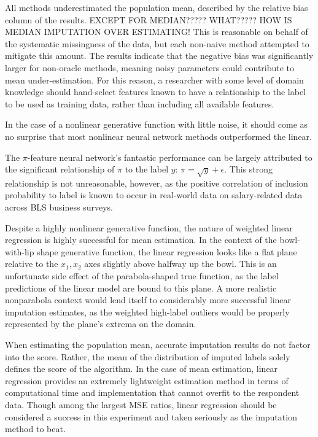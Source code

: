 \documentclass[12pt,twoside]{reedthesis}
\begin{document}
All methods underestimated the population mean, described by the
relative bias column of the results. EXCEPT FOR MEDIAN????? WHAT?????
HOW IS MEDIAN IMPUTATION OVER ESTIMATING! This is reasonable on behalf
of the systematic missingness of the data, but each non-naive method
attempted to mitigate this amount. The results indicate that the
negative bias was significantly larger for non-oracle methods, meaning
noisy parameters could contribute to mean under-estimation. For this
reason, a researcher with some level of domain knowledge should
hand-select features known to have a relationship to the label to be
used as training data, rather than including all available features.

In the case of a nonlinear generative function with little noise, it
should come as no surprise that most nonlinear neural network methods
outperformed the linear.

The \(\pi\)-feature neural network's fantastic performance can be
largely attributed to the significant relationship of \(\pi\) to the
label \(y\): \(\pi = \sqrt{y} + \epsilon\). This strong relationship is
not unreasonable, however, as the positive correlation of inclusion
probability to label is known to occur in real-world data on
salary-related data across BLS business surveys.

Despite a highly nonlinear generative function, the nature of weighted
linear regression is highly successful for mean estimation. In the
context of the bowl-with-lip shape generative function, the linear
regression looks like a flat plane relative to the \(x_1, x_2\) axes
slightly above halfway up the bowl. This is an unfortunate side effect
of the parabola-shaped true function, as the label predictions of the
linear model are bound to this plane. A more realistic nonparabola
context would lend itself to considerably more successful linear
imputation estimates, as the weighted high-label outliers would be
properly represented by the plane's extrema on the domain.

When estimating the population mean, accurate imputation results do not
factor into the score. Rather, the mean of the distribution of imputed
labels solely defines the score of the algorithm. In the case of mean
estimation, linear regression provides an extremely lightweight
estimation method in terms of computational time and implementation that
cannot overfit to the respondent data. Though among the largest MSE
ratios, linear regression should be considered a success in this
experiment and taken seriously as the imputation method to beat.
\end{document}
